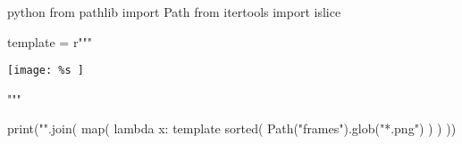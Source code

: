 \documentclass{beamer}
\begin{document}
\begin{sciffi}{python}
    from pathlib import Path
    from itertools import islice

    template = r"""
    \begin{frame}[plain]
        \centering
        \texttt{[image: 
            \%s
        ]}
    \end{frame}
    \clearpage
    """
    
    print("\n".join(
        map(
            lambda x: template %
            sorted(
                Path("frames").glob("*.png")
            )
        )
    ))
\end{sciffi}
\end{document}
